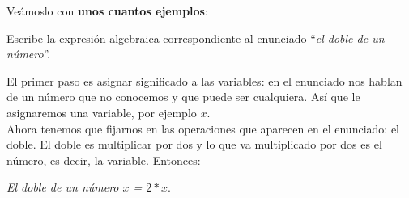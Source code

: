 \documentclass[a4paper,11pt,answers]{exam}
\begin{document}
  Veámoslo con \textbf{unos cuantos ejemplos}:
  \begin{questions}
  \question Escribe la expresión algebraica correspondiente al enunciado ``\emph{el doble de un número}''.\\
    \begin{solution}
      El primer paso es asignar significado a las variables: en el enunciado nos hablan de un número que no conocemos y que puede ser cualquiera. Así que le asignaremos una variable, por ejemplo $x$.\\
      Ahora tenemos que fijarnos en las operaciones que aparecen en el enunciado: el doble. El doble es multiplicar por dos y lo que va multiplicado por dos es el número, es decir, la variable. Entonces:
      \begin{center}
        \emph{El doble de un número $x$ = $2*x$}.
      \end{center}
    \end{solution}


\end{questions}
\end{document}
